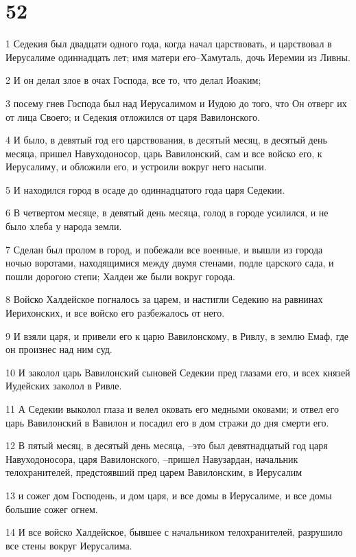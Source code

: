 \chapter{52}

\par 1 Седекия был двадцати одного года, когда начал царствовать, и царствовал в Иерусалиме одиннадцать лет; имя матери его--Хамуталь, дочь Иеремии из Ливны.
\par 2 И он делал злое в очах Господа, все то, что делал Иоаким;
\par 3 посему гнев Господа был над Иерусалимом и Иудою до того, что Он отверг их от лица Своего; и Седекия отложился от царя Вавилонского.
\par 4 И было, в девятый год его царствования, в десятый месяц, в десятый день месяца, пришел Навуходоносор, царь Вавилонский, сам и все войско его, к Иерусалиму, и обложили его, и устроили вокруг него насыпи.
\par 5 И находился город в осаде до одиннадцатого года царя Седекии.
\par 6 В четвертом месяце, в девятый день месяца, голод в городе усилился, и не было хлеба у народа земли.
\par 7 Сделан был пролом в город, и побежали все военные, и вышли из города ночью воротами, находящимися между двумя стенами, подле царского сада, и пошли дорогою степи; Халдеи же были вокруг города.
\par 8 Войско Халдейское погналось за царем, и настигли Седекию на равнинах Иерихонских, и все войско его разбежалось от него.
\par 9 И взяли царя, и привели его к царю Вавилонскому, в Ривлу, в землю Емаф, где он произнес над ним суд.
\par 10 И заколол царь Вавилонский сыновей Седекии пред глазами его, и всех князей Иудейских заколол в Ривле.
\par 11 А Седекии выколол глаза и велел оковать его медными оковами; и отвел его царь Вавилонский в Вавилон и посадил его в дом стражи до дня смерти его.
\par 12 В пятый месяц, в десятый день месяца, --это был девятнадцатый год царя Навуходоносора, царя Вавилонского, --пришел Навузардан, начальник телохранителей, предстоявший пред царем Вавилонским, в Иерусалим
\par 13 и сожег дом Господень, и дом царя, и все домы в Иерусалиме, и все домы большие сожег огнем.
\par 14 И все войско Халдейское, бывшее с начальником телохранителей, разрушило все стены вокруг Иерусалима.
